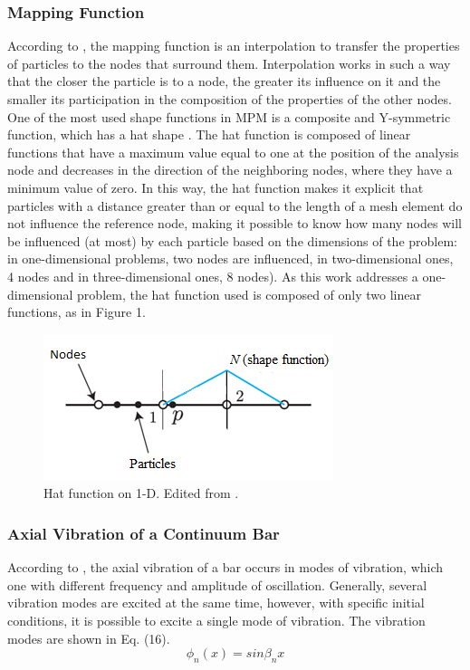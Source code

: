 \documentclass[preprint,12pt]{elsarticle}
\begin{document}
\subsubsection{Mapping Function}
According to \cite{Nguyen2014}, the mapping function is an interpolation to transfer the properties of particles to the nodes that surround them. Interpolation works in such a way that the closer the particle is to a node, the greater its influence on it and the smaller its participation in the composition of the properties of the other nodes. One of the most used shape functions in MPM is a composite and Y-symmetric function, which has a hat shape \cite{Nguyen2014}. The hat function is composed of linear functions that have a maximum value equal to one at the position of the analysis node and decreases in the direction of the neighboring nodes, where they have a minimum value of zero. In this way, the hat function makes it explicit that particles with a distance greater than or equal to the length of a mesh element do not influence the reference node, making it possible to know how many nodes will be influenced (at most) by each particle based on the dimensions of the problem: in one-dimensional problems, two nodes are influenced, in two-dimensional ones, 4 nodes and in three-dimensional ones, 8 nodes).
As this work addresses a one-dimensional problem, the hat function used is composed of only two linear functions, as in Figure 1.
\begin{figure}
    	\includegraphics{Hat Function.png}
    	\centering
    	\caption{Hat function on 1-D. Edited from \cite{Nguyen2014}.}
    	\centering
    \end{figure}

\subsubsection{Axial Vibration of a Continuum Bar}
According to \cite{Bardenhagen2002}, the axial vibration of a bar occurs in modes of vibration, which one with different frequency and amplitude of oscillation. Generally, several vibration modes are excited at the same time, however, with specific initial conditions, it is possible to excite a single mode of vibration. The vibration modes are shown in Eq. (16).
\begin{equation}
\phi_n(x)=sin\beta_nx    
\end{equation}
\end{document}
